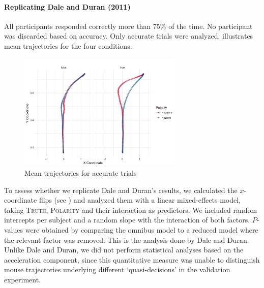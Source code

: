 \documentclass[draft]{article}
\begin{document}
\paragraph{Replicating Dale and Duran (2011)}
All participants responded correctly more than 75\% of the time. No participant was discarded based on accuracy.  Only accurate trials were analyzed.  illustrates mean trajectories for the four conditions.
\begin{figure}
\centering
\includegraphics[width=0.7\textwidth]{negation-data-mean-trajectory.png}
\caption{Mean trajectories for accurate trials} \label{fig:mean.trajectory-negation}
\end{figure}

To assess whether we replicate Dale and Duran's results, we calculated the $x$-coordinate flips (see ) and analyzed them with a linear mixed-effects model, taking \textsc{Truth}, \textsc{Polarity} and their interaction as predictors. We included random intercepts per subject and a random slope with the interaction of both factors. $P$-values were obtained by comparing the omnibus model to a reduced model where the relevant factor was removed. This is the analysis done by Dale and Duran. 
Unlike Dale and Duran, we did not perform statistical analyses based on the acceleration component, since this quantitative measure was unable to distinguish mouse trajectories underlying different `quasi-decisions' in the validation experiment.

\end{document}
